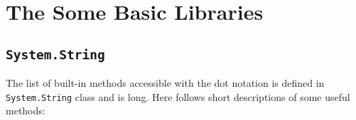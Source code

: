 \chapter{The Some Basic Libraries}
\label{chap:collection}


\section{\texttt{System.String}}
\label{sec:system.string}
The list of built-in methods accessible with the dot notation is defined in \lstinline|System.String| class and is long. Here follows short descriptions of some useful methods:
